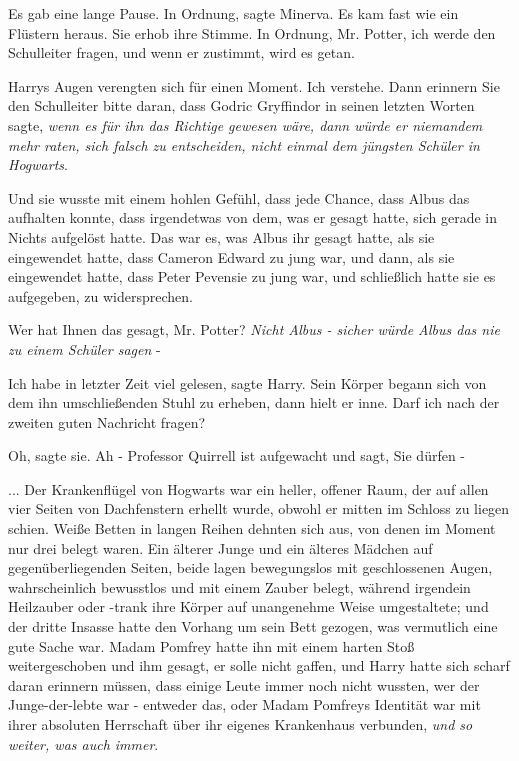 Es gab eine lange Pause. \glqq{}In Ordnung\grqq{}, sagte Minerva. Es kam fast wie
ein Flüstern heraus. Sie erhob ihre Stimme. \glqq{}In Ordnung, Mr. Potter, ich
werde den Schulleiter fragen, und wenn er zustimmt, wird es getan.\grqq{}

Harrys Augen verengten sich für einen Moment. \glqq{}Ich verstehe. Dann erinnern
Sie den Schulleiter bitte daran, dass Godric Gryffindor in seinen letzten Worten
sagte, \emph{wenn es für ihn das Richtige gewesen wäre, dann würde er niemandem
mehr raten, sich falsch zu entscheiden, nicht einmal dem jüngsten Schüler in
Hogwarts}.\grqq{}

Und sie wusste mit einem hohlen Gefühl, dass jede Chance, dass Albus das
aufhalten konnte, dass irgendetwas von dem, was er gesagt hatte, sich gerade in
Nichts aufgelöst hatte. Das war es, was Albus ihr gesagt hatte, als sie
eingewendet hatte, dass Cameron Edward zu jung war, und dann, als sie
eingewendet hatte, dass Peter Pevensie zu jung war, und schließlich hatte sie es
aufgegeben, zu widersprechen.

\glqq{}Wer hat Ihnen das gesagt, Mr. Potter?\grqq{} \emph{Nicht Albus - sicher
würde Albus das nie zu einem Schüler sagen} -

\glqq{}Ich habe in letzter Zeit viel gelesen\grqq{}, sagte Harry. Sein Körper
begann sich von dem ihn umschließenden Stuhl zu erheben, dann hielt er inne.
\glqq{}Darf ich nach der zweiten guten Nachricht fragen?\grqq{}

\glqq{}Oh\grqq{}, sagte sie. \glqq{}Ah - Professor Quirrell ist aufgewacht und
sagt, Sie dürfen -\grqq{}

... Der Krankenflügel von Hogwarts war ein heller, offener Raum, der auf allen
vier Seiten von Dachfenstern erhellt wurde, obwohl er mitten im Schloss zu
liegen schien. Weiße Betten in langen Reihen dehnten sich aus, von denen im
Moment nur drei belegt waren. Ein älterer Junge und ein älteres Mädchen auf
gegenüberliegenden Seiten, beide lagen bewegungslos mit geschlossenen Augen,
wahrscheinlich bewusstlos und mit einem Zauber belegt, während irgendein
Heilzauber oder -trank ihre Körper auf unangenehme Weise umgestaltete; und der
dritte Insasse hatte den Vorhang um sein Bett gezogen, was vermutlich eine gute
Sache war. Madam Pomfrey hatte ihn mit einem harten Stoß weitergeschoben und ihm
gesagt, er solle nicht gaffen, und Harry hatte sich scharf daran erinnern
müssen, dass einige Leute immer noch nicht wussten, wer der Junge-der-lebte war
- entweder das, oder Madam Pomfreys Identität war mit ihrer absoluten Herrschaft
über ihr eigenes Krankenhaus verbunden, \emph{und so weiter, was auch immer}.

